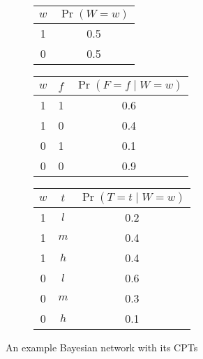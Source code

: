\documentclass{article}
\theoremstyle{definition}
\theoremstyle{remark}
\begin{document}
\begin{figure}
  \centering
  \begin{subfigure}{0.2\textwidth}
    \centering
  \end{subfigure}%
  \begin{subfigure}{0.8\textwidth}
    \centering
    \begin{tabular}[t]{cc}
      \toprule
      $w$ & $\Pr(W = w)$ \\
      \midrule
      1 & 0.5 \\
      0 & 0.5 \\
      \bottomrule
    \end{tabular}
    \begin{tabular}[t]{ccc}
      \toprule
      $w$ & $f$ & $\Pr(F = f \mid W = w)$ \\
      \midrule
      1 & 1 & 0.6 \\
      1 & 0 & 0.4 \\
      0 & 1 & 0.1 \\
      0 & 0 & 0.9 \\
      \bottomrule
    \end{tabular}
    \begin{tabular}[t]{ccc}
      \toprule
      $w$ & $t$ & $\Pr(T = t \mid W = w)$ \\
      \midrule
      1 & $l$ & 0.2 \\
      1 & $m$ & 0.4 \\
      1 & $h$ & 0.4 \\
      0 & $l$ & 0.6 \\
      0 & $m$ & 0.3 \\
      0 & $h$ & 0.1 \\
      \bottomrule
    \end{tabular}
  \end{subfigure}
  \caption{An example Bayesian network with its CPTs}
  \label{fig:example_bn}
\end{figure}

\end{document}
